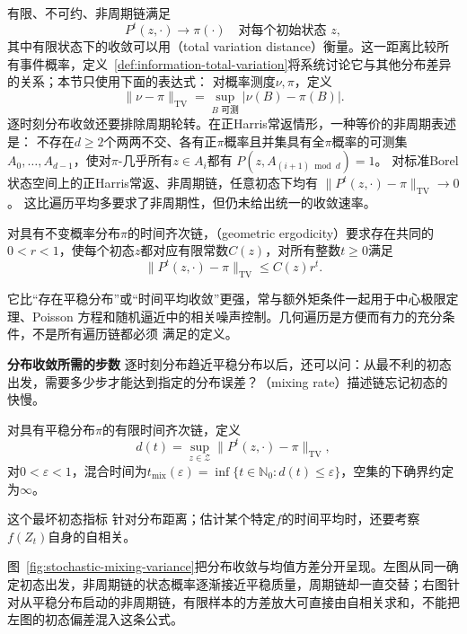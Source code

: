 有限、不可约、非周期链满足
\begin{equation}
  P^t(z,\cdot)\longrightarrow\pi(\cdot)
  \quad\text{对每个初始状态 }z,
  \label{eq:stoch-finite-chain-distribution-convergence}
\end{equation}
其中有限状态下的收敛可以用（total variation distance）衡量。这一距离比较所有事件概率，定义~\ref{def:information-total-variation}将系统讨论它与其他分布差异的关系；本节只使用下面的表达式：
对概率测度$\nu,\pi$，定义
\[
  \lVert\nu-\pi\rVert_{\mathrm{TV}}
  =
  \sup_{B\text{ 可测}}|\nu(B)-\pi(B)|.
\]
逐时刻分布收敛还要排除周期轮转。在正Harris常返情形，一种等价的非周期表述是：
不存在\(d\geq2\)个两两不交、各有正\(\pi\)概率且并集具有全\(\pi\)概率的可测集
\(A_0,\ldots,A_{d-1}\)，使对\(\pi\)-几乎所有\(z\in A_i\)都有
\(P(z,A_{(i+1)\bmod d})=1\)。
对标准Borel状态空间上的正Harris常返、非周期链，任意初态下均有
\(\|P^t(z,\cdot)-\pi\|_{\mathrm{TV}}\to0\)。
这比遍历平均多要求了非周期性，但仍未给出统一的收敛速率。

\begin{definition}[几何遍历性]
  \label{def:stoch-geometric-ergodicity}
  对具有不变概率分布\(\pi\)的时间齐次链，（geometric ergodicity）要求存在共同的$0<r<1$，使每个初态\(z\)都对应有限常数$C(z)$，对所有整数\(t\geq0\)满足
\[
  \lVert P^t(z,\cdot)-\pi\rVert_{\mathrm{TV}}
  \leq C(z)r^t.
\]
\end{definition}
它比“存在平稳分布”或“时间平均收敛”更强，常与额外矩条件一起用于中心极限定理、Poisson
方程和随机逼近中的相关噪声控制。几何遍历是方便而有力的充分条件，不是所有遍历链都必须
满足的定义。

\par\medskip\noindent\textbf{分布收敛所需的步数}\quad
逐时刻分布趋近平稳分布以后，还可以问：从最不利的初态出发，需要多少步才能达到指定的分布误差？（mixing rate）描述链忘记初态的快慢。
\begin{definition}[有限链的混合时间]
  \label{def:stoch-finite-mixing-time}
对具有平稳分布\(\pi\)的有限时间齐次链，定义
\[
  d(t)
  =
  \sup_{z\in\mathcal{Z}}
  \lVert P^t(z,\cdot)-\pi\rVert_{\mathrm{TV}},
\]
对\(0<\varepsilon<1\)，混合时间为\(t_{\mathrm{mix}}(\varepsilon)=\inf\{t\in\mathbb N_0:d(t)\leq\varepsilon\}\)，空集的下确界约定为\(\infty\)。
\end{definition}
这个最坏初态指标
针对分布距离；估计某个特定$f$的时间平均时，还要考察$f(Z_t)$自身的自相关。

图~\ref{fig:stochastic-mixing-variance}把分布收敛与均值方差分开呈现。左图从同一确定初态出发，非周期链的状态概率逐渐接近平稳质量，周期链却一直交替；右图针对从平稳分布启动的非周期链，有限样本的方差放大可直接由自相关求和，不能把左图的初态偏差混入这条公式。

